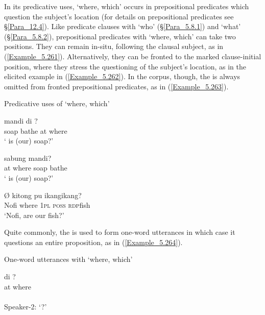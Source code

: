 In its predicative uses,  ‘where, which’ occurs in prepositional predicates which question the subject’s location (for details on prepositional predicates see §\ref{Para_12.4}). Like predicate clauses with  ‘who’ (§\ref{Para_5.8.1}) and  ‘what’ (§\ref{Para_5.8.2}), prepositional predicates with  ‘where, which’ can take two positions. They can remain in-situ, following the clausal subject, as in (\ref{Example_5.261}). Alternatively, they can be fronted to the marked clause-initial position, where they stress the questioning of the subject’s location, as in the elicited example in (\ref{Example_5.262}). In the corpus, though, the  is always omitted from fronted prepositional predicates, as in (\ref{Example_5.263}).


\begin{styleExampleTitle}
Predicative uses of  ‘where, which’
\end{styleExampleTitle}

\ea
\label{Example_5.261}
 {mandi} {di} {?}\\ %
 soap  bathe  at  where\\
\glt 
‘ is (our) soap?’ \textstyleExampleSource{[081025-006-Cv.0026]}
\z

\ea
\label{Example_5.262}
 {} {sabung} {mandi?}\\ %
 at  where  soap  bathe\\
\glt 
‘ is (our) soap?’ \textstyleExampleSource{[Elicited MY131112.006]}
\z

\ea
\label{Example_5.263}
 {Ø} {} {kitong} {pu} {ikang{\Tilde}ikang?}\\ %
 Nofi { }   where  \textsc{1pl}  \textsc{poss}  \textsc{rdp}{\Tilde}fish\\
\glt 
‘Nofi,  are our fish?’ \textstyleExampleSource{[080917-006-CvHt.0002]}
\z


Quite commonly, the  is used to form one-word utterances in which case it questions an entire proposition, as in (\ref{Example_5.264}).


\begin{styleExampleTitle}
One-word utterances with  ‘where, which’
\end{styleExampleTitle}

\ea
\label{Example_5.264}
 {di} {?}\\ %
  { } at  where\\
\\
Speaker-2: ‘?’ \textstyleExampleSource{[080922-002-Cv.0029-0030]}
\z


